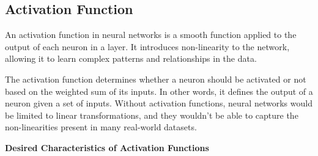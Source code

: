 \documentclass[nobib]{tufte-handout} %
\begin{document}
\subsection{Activation Function}%
  \label{sub:ActivationFunction}
An activation function in neural networks is a smooth function applied to the output of each neuron in a layer. It introduces non-linearity to the network, allowing it to learn complex patterns and relationships in the data.

The activation function determines whether a neuron should be activated or not based on the weighted sum of its inputs. In other words, it defines the output of a neuron given a set of inputs. Without activation functions, neural networks would be limited to linear transformations, and they wouldn't be able to capture the non-linearities present in many real-world datasets. 

\vspace{5mm}
\noindent \textbf{Desired Characteristics of Activation Functions} \citep{jagtap2022important}
\end{document}
